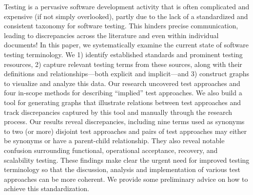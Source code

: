 \label{abstract}%
Testing is a pervasive software development activity that is often
complicated and expensive (if not simply overlooked), partly due to
the lack of a standardized and consistent taxonomy for software testing.
This hinders precise communication, leading to discrepancies across the
literature and even within individual documents!
In this paper, we systematically examine the current state of software
testing terminology. We 1) identify established standards
and prominent testing resources, 2) capture relevant testing terms
from these sources, along with their definitions and relationships---both
explicit and implicit---and 3) construct graphs to visualize and analyze
this data. Our research uncovered \approachCount{} test approaches and
four in-scope methods for describing ``implied'' test approaches. We also build
a tool for generating graphs that illustrate relations between test
approaches and track discrepancies captured by this tool and manually through
the research process. Our results reveal \totalDiscreps{} discrepancies,
including nine terms used as synonyms to two (or more)
disjoint test approaches and \parSynCount{} pairs of test approaches may
either be synonyms or have a parent-child relationship. They also reveal
notable confusion surrounding functional, operational acceptance, recovery,
and scalability testing. These findings make clear
the urgent need for improved testing terminology so that the discussion,
analysis and implementation of various test approaches can be more coherent.
We provide some preliminary advice on how to achieve this standardization.